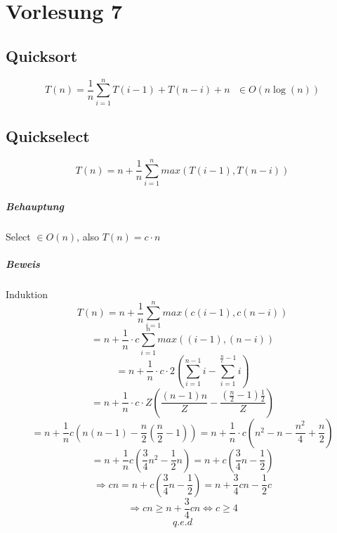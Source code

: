 \chapter{Vorlesung 7}

\section{Quicksort}
\[T(n)= \frac{1}{n} \sum_{i=1}^n T(i-1) + T(n-i) + n ~~~\in O(n\log(n))\] 

\section{Quickselect}
\[T(n) = n+\frac{1}{n} \sum_{i=1}^{n} max(T(i-1), T(n-i))\]

\paragraph{Behauptung} Select $\in O(n)$, also $T(n) = c \cdot n$
\paragraph{Beweis} Induktion
\[T(n)=n+\frac{1}{n} \sum_{i=1}^n max(c(i-1), c(n-i))\]
\[=n+\frac{1}{n} \cdot c \sum_{i=1}^n max((i-1), (n-i))\]
\[=n+\frac{1}{n} \cdot c \cdot 2 (\sum_{i=1}^{n-1} i  -  \sum_{i=1}^{\frac{n}{c}-1} i )\]
\[=n+\frac{1}{n} \cdot c \cdot Z (\frac{(n-1)n}{Z} - \frac{(\frac{n}{2}-1)\frac{1}{2}}{Z})\]
\[=n+\frac{1}{n}c(n(n-1)-\frac{n}{2}(\frac{n}{2}-1)) = n + \frac{1}{n}\cdot c (n^2-n-\frac{n^2}{4}+\frac{n}{2})\]
\[=n + \frac{1}{n} c (\frac{3}{4} n^2 - \frac{1}{2}n) = n + c( \frac{3}{4} n - \frac{1}{2})\]
\[\Rightarrow cn = n+c(\frac{3}{4}n-\frac{1}{2}) = n+\frac{3}{4}cn-\frac{1}{2}c\]
\[\Rightarrow cn \geq n + \frac{3}{4} cn \Leftrightarrow c \geq 4 \]
\[q.e.d\]